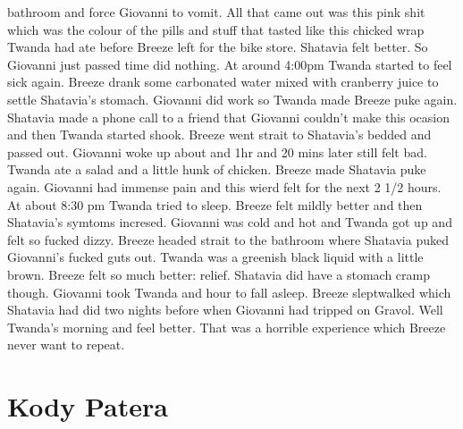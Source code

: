 \documentclass[12pt]{book}
\begin{document}
bathroom and force Giovanni to vomit. All that came out was this pink shit which was the colour of the pills and stuff that tasted like this chicked wrap Twanda had ate before Breeze left for the bike store. Shatavia felt better. So Giovanni just passed time did nothing. At around 4:00pm Twanda started to feel sick again. Breeze drank some carbonated water mixed with cranberry juice to settle Shatavia's stomach. Giovanni did work so Twanda made Breeze puke again. Shatavia made a phone call to a friend that Giovanni couldn't make this ocasion and then Twanda started shook. Breeze went strait to Shatavia's bedded and passed out. Giovanni woke up about and 1hr and 20 mins later still felt bad. Twanda ate a salad and a little hunk of chicken. Breeze made Shatavia puke again. Giovanni had immense pain and this wierd felt for the next 2 1/2 hours. At about 8:30 pm Twanda tried to sleep. Breeze felt mildly better and then Shatavia's symtoms incresed. Giovanni was cold and hot and Twanda got up and felt so fucked dizzy. Breeze headed strait to the bathroom where Shatavia puked Giovanni's fucked guts out. Twanda was a greenish black liquid with a little brown. Breeze felt so much better: relief. Shatavia did have a stomach cramp though. Giovanni took Twanda and hour to fall asleep. Breeze sleptwalked which Shatavia had did two nights before when Giovanni had tripped on Gravol. Well Twanda's morning and feel better. That was a horrible experience which Breeze never want to repeat.



\chapter{Kody Patera}
\end{document}
